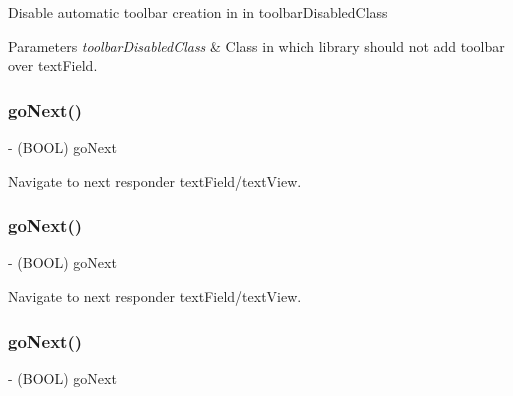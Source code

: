 Disable automatic toolbar creation in in toolbar\+Disabled\+Class


\begin{DoxyParams}{Parameters}
{\em toolbar\+Disabled\+Class} & Class in which library should not add toolbar over text\+Field. \\
\hline
\end{DoxyParams}
\mbox{\label{interface_i_q_keyboard_manager_a099ee16abf2cfa1077faf4de6a86e649}} 
\subsubsection{\texorpdfstring{go\+Next()}{goNext()}\hspace{0.1cm}{\footnotesize\ttfamily [1/3]}}
{\footnotesize\ttfamily -\/ (B\+O\+OL) go\+Next \begin{DoxyParamCaption}{ }\end{DoxyParamCaption}}

Navigate to next responder text\+Field/text\+View. \mbox{\label{interface_i_q_keyboard_manager_a099ee16abf2cfa1077faf4de6a86e649}} 
\subsubsection{\texorpdfstring{go\+Next()}{goNext()}\hspace{0.1cm}{\footnotesize\ttfamily [2/3]}}
{\footnotesize\ttfamily -\/ (B\+O\+OL) go\+Next \begin{DoxyParamCaption}{ }\end{DoxyParamCaption}}

Navigate to next responder text\+Field/text\+View. \mbox{\label{interface_i_q_keyboard_manager_a099ee16abf2cfa1077faf4de6a86e649}} 
\subsubsection{\texorpdfstring{go\+Next()}{goNext()}\hspace{0.1cm}{\footnotesize\ttfamily [3/3]}}
{\footnotesize\ttfamily -\/ (B\+O\+OL) go\+Next \begin{DoxyParamCaption}{ }\end{DoxyParamCaption}}

